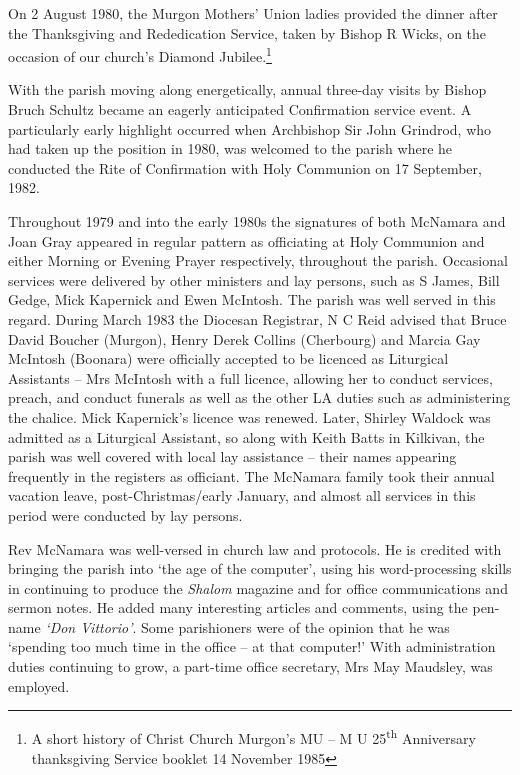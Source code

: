 On 2 August 1980, the Murgon Mothers' Union ladies provided the dinner after the Thanksgiving and Rededication Service, taken by Bishop R Wicks, on the occasion of our church's Diamond Jubilee.\footnote{A short history of Christ Church Murgon's MU -- M U 25\textsuperscript{th} Anniversary thanksgiving Service booklet 14 November 1985}


With the parish moving along energetically, annual three-day visits by Bishop Bruch Schultz became an eagerly anticipated Confirmation service event. A particularly early highlight occurred when Archbishop Sir John Grindrod, who had taken up the position in 1980, was welcomed to the parish where he conducted the Rite of Confirmation with Holy Communion on 17 September, 1982.



Throughout 1979 and into the early 1980s the signatures of both McNamara and Joan Gray appeared in regular pattern as officiating at Holy Communion and either Morning or Evening Prayer respectively, throughout the parish. Occasional services were delivered by other ministers and lay persons, such as S James, Bill Gedge, Mick Kapernick and Ewen McIntosh. The parish was well served in this regard. During March 1983 the Diocesan Registrar, N C Reid advised that Bruce David Boucher (Murgon), Henry Derek Collins (Cherbourg) and Marcia Gay McIntosh (Boonara) were officially accepted to be licenced as Liturgical Assistants -- Mrs McIntosh with a full licence, allowing her to conduct services, preach, and conduct funerals as well as the other LA duties such as administering the chalice. Mick Kapernick's licence was renewed. Later, Shirley Waldock was admitted as a Liturgical Assistant, so along with Keith Batts in Kilkivan, the parish was well covered with local lay assistance -- their names appearing frequently in the registers as officiant. The McNamara family took their annual vacation leave, post-Christmas/early January, and almost all services in this period were conducted by lay persons.



Rev McNamara was well-versed in church law and protocols. He is credited with bringing the parish into `the age of the computer', using his word-processing skills in continuing to produce the \emph{Shalom} magazine and for office communications and sermon notes. He added many interesting articles and comments, using the pen-name \emph{`Don Vittorio'}. Some parishioners were of the opinion that he was `spending too much time in the office -- at that computer!' With administration duties continuing to grow, a part-time office secretary, Mrs May Maudsley, was employed.



